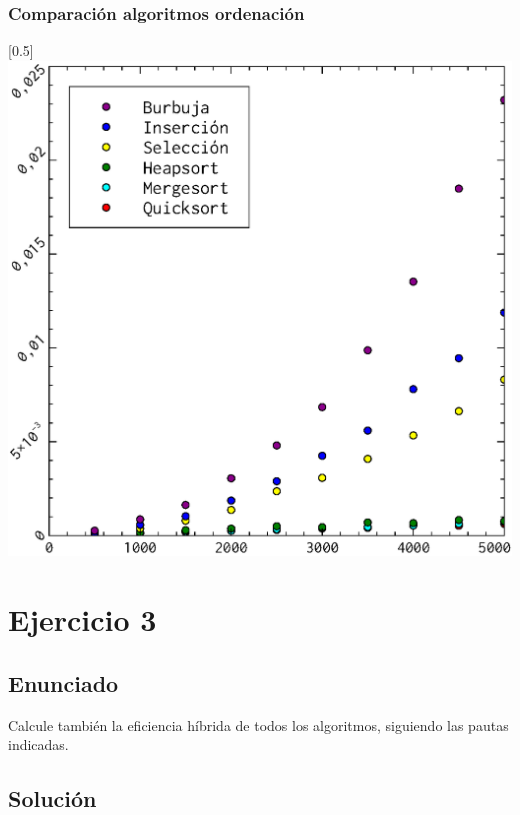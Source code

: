 \documentclass[compress]{beamer}
\begin{document}
\begin{frame}
\frametitle{Comparación algoritmos ordenación}
	\begin{center}
\scalebox{0.53}[0.5]{
    \includegraphics[]{ord_mod.eps}
}
\end{center}
\end{frame}

\section{Ejercicio 3}
\subsection{Enunciado}
\begin{frame}
Calcule también la eficiencia híbrida de todos los algoritmos, siguiendo las pautas indicadas. %
\end{frame}
\subsection{Solución}
	
\end{document}
